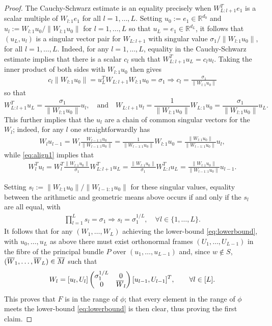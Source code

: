 \documentclass{article}
\newcommand{\RB}{\mathbb{R}}
\newcommand{\bW}{\smash{\overline{W}}\vphantom{W}}
\newcommand{\bM}{\overline{M}}
\theoremstyle{plain}
\theoremstyle{definition}
\theoremstyle{remark}
\begin{document}
\begin{proof}
    The Cauchy-Schwarz estimate is an equality precisely when $W_{L:l+1}^Te_1$ is a scalar multiple of $W_{l:1}e_1$ for all $l=1,\dots,L$. Setting $u_0:=e_1\in\RB^{d_0}$ and $u_l:=W_{l:1}u_0/\|W_{l:1}u_0\|$ for $l=1,\dots, L$ so that $u_L = e_1\in\RB^{d_L}$, it follows that $(u_L,u_l)$ is a singular vector pair for $W_{L:l+1}$ with singular value $\sigma_1/\|W_{l:1}u_0\|$, for all $l=1,\dots, L$. Indeed, for any $l=1,\dots,L$, equality in the Cauchy-Schwarz estimate implies that there is a scalar $c_l$ such that $W_{L:l+1}^Tu_L= c_lu_l$. Taking the inner product of both sides with $W_{l:1}u_0$ then gives
    \begin{align}
    c_l\|W_{l:1}u_0\| = u_L^TW_{L:l+1}W_{l:1}u_0 = \sigma_1\Rightarrow c_l = \frac{\sigma_1}{\|W_{l:1}u_0\|}
    \end{align}
    so that
    \begin{equation}\label{eq:align1}
        W_{L:l+1}^Tu_L= \frac{\sigma_1}{\|W_{l:1}u_0\|}u_l,\quad \text{and}\quad  W_{L:l+1}u_l = \frac{1}{\|W_{l:1}u_0\|}W_{L:1}u_0 = \frac{\sigma_1}{\|W_{l:1}u_0\|}u_L.
    \end{equation}
    This further implies that the $u_l$ are a chain of common singular vectors for the $W_l$; indeed, for any $l$ one straightforwardly has
    \begin{align}
    W_lu_{l-1} = W_l\frac{W_{l-1:1}u_0}{\|W_{l-1:1}u_0\|} = \frac{1}{\|W_{l-1:1}u_0\|}W_{l:1}u_0 = \frac{\|W_{l:1}u_0\|}{\|W_{l-1:1}u_0\|}u_l,
    \end{align}
    while \eqref{eq:align1} implies that
    \begin{align}
    W_l^Tu_l = W_l^T\frac{\|W_{l:1}u_0\|}{\sigma_1}W_{L:l+1}^Tu_L = \frac{\|W_{l:1}u_0\|}{\sigma_1}W_{L:l}^Tu_L = \frac{\|W_{l:1}u_0\|}{\|W_{l-1:1}u_0\|}u_{l-1}.
    \end{align}
    
    Setting $s_l:=\|W_{l:1}u_0\|/\|W_{l-1:1}u_0\|$ for these singular values, equality between the arithmetic and geometric means above occurs if and only if the $s_l$ are all equal, with
    \begin{align}
    \prod_{l=1}^Ls_l = \sigma_1\Rightarrow s_l = \sigma_1^{1/L},\quad\forall l\in\{1,\dots,L\}.
    \end{align}
    It follows that for any $(W_1,\dots,W_L)$ achieving the lower-bound \eqref{eq:lowerbound}, with $u_0,\dots,u_L$ as above there must exist orthonormal frames $(U_1,\dots,U_{L-1})$ in the fibre of the principal bundle $P$ over $(u_1,\dots,u_{L-1})$ and, since $w\notin S$, $(\bW_1,\dots,\bW_L)\in\bM$ such that
    \begin{align}
    W_l = [u_l,U_l]\begin{pmatrix} \sigma_1^{1/L} & 0 \\ 0 & \bW_l\end{pmatrix}[u_{l-1},U_{l-1}]^T,\qquad \forall l\in[L].
    \end{align}
    This proves that $F$ is in the range of $\phi$; that every element in the range of $\phi$ meets the lower-bound \eqref{eq:lowerbound} is then clear, thus proving the first claim.


\end{proof}
\end{document}
